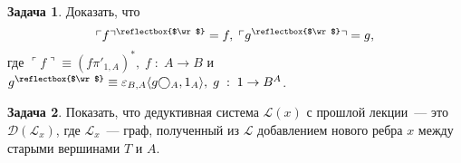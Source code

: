 \documentclass[10pt]{article}
\theoremstyle{definition}
\newtheorem{Pm}{Задача}[subsection]
\DeclareRobustCommand{\ArrowOf}{\text{\reflectbox{$\wr$}}}
\begin{document}
\begin{Pm}
Доказать, что
$$
  \ulcorner f \urcorner^\ArrowOf = f,\; \ulcorner g^\ArrowOf \urcorner = g\text{,}
$$
где $\ulcorner f \urcorner \equiv (f\pi'_{1,A})^*,\; f\; :\; A \rightarrow B$ и $g^\ArrowOf \equiv \varepsilon_{B,A} \langle g \bigcirc_A, 1_A \rangle,\; g\; :\; 1 \rightarrow B^A$.
\end{Pm}

\begin{Pm}
Показать, что дедуктивная система $\mathscr{L}(x)$ с прошлой лекции~--- это $\mathscr{D}(\mathscr{L}_x)$, где $\mathscr{L}_x$~--- граф, полученный из $\mathscr{L}$ добавлением нового ребра $x$ между старыми вершинами $T$ и $A$.
\end{Pm}
\end{document}
